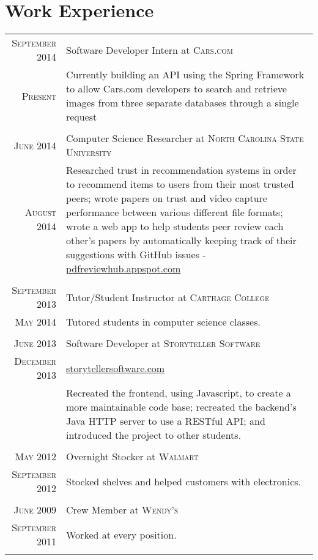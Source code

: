 \documentclass[letterpaper,10pt]{article}
\begin{document}
    \section{Work Experience}
    \begin{tabular}{r|p{13.9cm}}
    
     \textsc{September 2014} & Software Developer Intern at \textsc{Cars.com}
     \\\textsc{Present}
     &\small{Currently building an API using the Spring Framework to allow Cars.com developers to search and retrieve images from three separate databases through a single request} \\\multicolumn{2}{c}{}\\
    
     \textsc{June 2014} & Computer Science Researcher at \textsc{North Carolina State University}
     \\\textsc{August 2014}
     &\small{Researched trust in recommendation systems in order to recommend items to users from their most trusted peers; wrote papers on trust and video capture performance between various different file formats; wrote a web app to help students peer review each other's papers by automatically keeping track of their suggestions with GitHub issues -  \href{http://pdfreviewhub.appspot.com}{pdfreviewhub.appspot.com}} \\\multicolumn{2}{c}{}\\
     
     \textsc{September 2013} & Tutor/Student Instructor at \textsc{Carthage College} \\\textsc{May 2014}
     &\small{Tutored students in computer science classes.}\\\multicolumn{2}{c}{} \\
    
     \textsc{June 2013} & Software Developer at \textsc{Storyteller Software} \\\textsc{December 2013}
     &\small{\href{http://www.storytellersoftware.com/}{storytellersoftware.com}} \\
     &\small{Recreated the frontend, using Javascript, to create a more maintainable code base; recreated the backend's Java HTTP server to use a RESTful API; and introduced the project to other students.} \\\multicolumn{2}{c}{} \\
    
     \textsc{May 2012} & Overnight Stocker at \textsc{Walmart} \\\textsc{September 2012}
     &\small{Stocked shelves and helped customers with electronics.}\\\multicolumn{2}{c}{} \\
     
     \textsc{June 2009} & Crew Member at \textsc{Wendy's} \\\textsc{September 2011}
     &\small{Worked at every position.}\\\multicolumn{2}{c}{} \\
     
    \end{tabular}
    
\end{document}
